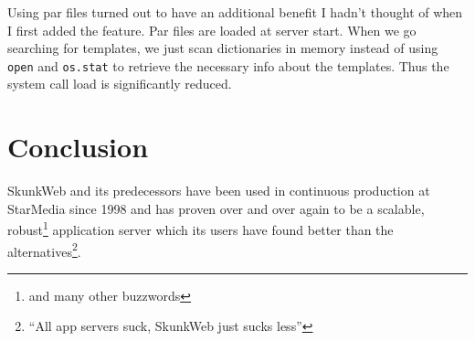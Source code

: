 \documentclass[twocolumn]{article}
\begin{document}
Using par files turned out to have an additional benefit I hadn't
thought of when I first added the feature.  Par files are loaded at
server start.  When we go searching for templates, we just scan
dictionaries in memory instead of using \texttt{open} and
\texttt{os.stat} to retrieve the necessary info about the templates.
Thus the system call load is significantly reduced.

\section{Conclusion}
SkunkWeb and its predecessors have been used in continuous production 
at StarMedia since 1998 and has proven over and over again to
be a scalable, robust\footnote{and many other buzzwords} application
server which its users have found better than the
alternatives\footnote{``All app servers suck, SkunkWeb just sucks
less''}.



\end{document}
